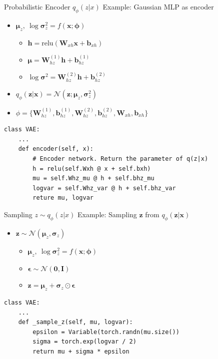 \documentclass{beamer}
\newcommand{\relu}{\mathrm{relu}}
\begin{document}
\begin{frame}[fragile]{Probabilistic Encoder $q_\phi(z|x)$}
	Example: Gaussian MLP as encoder
	\begin{itemize}
		\item $\bm{\mu}_z,~\log\bm{\sigma}_z^2=f(\mathbf{x};\bm{\phi})$
		\begin{itemize}
			\item $\mathbf{h} = \relu\left(\mathbf{W}_{xh}\mathbf{x}+\mathbf{b}_{xh}\right)$
			\item $\bm{\mu} = \mathbf{W}^{(1)}_{hz}\mathbf{h}+\mathbf{b}^{(1)}_{hz}$
			\item $\log \bm{\sigma}^2 = \mathbf{W}^{(2)}_{hz}\mathbf{h}+\mathbf{b}^{(2)}_{hz}$
		\end{itemize}
		\item $q_\phi(\mathbf{z}|\mathbf{x})=\mathcal{N}(\mathbf{z};\bm{\mu}_z, \bm{\sigma}_z^2)$
		\item $\phi = \{\mathbf{W}^{(1)}_{hz}, \mathbf{b}^{(1)}_{hz}, \mathbf{W}^{(2)}_{hz}, \mathbf{b}^{(2)}_{hz}, \mathbf{W}_{xh}, \mathbf{b}_{xh}\}$
	\end{itemize}
\begin{verbatim}
class VAE:
    ...
    def encoder(self, x):
        # Encoder network. Return the parameter of q(z|x)
        h = relu(self.Wxh @ x + self.bxh)
        mu = self.Whz_mu @ h + self.bhz_mu      
        logvar = self.Whz_var @ h + self.bhz_var
        reture mu, logvar
\end{verbatim}
\end{frame}

\begin{frame}[fragile]{Sampling $z\sim q_\phi(z|x)$}
Example: Sampling $\mathbf{z}$ from $q_\phi(\mathbf{z}|\mathbf{x})$
\begin{itemize}
	\item $\mathbf{z}\sim \mathcal{N}(\bm{\mu}_z, \bm{\sigma}_z)$
	\begin{itemize}
		\item $\bm{\mu}_z,~\log\bm{\sigma}^2_z=f(\mathbf{x};\bm{\phi})$
		\item $\bm{\epsilon} \sim \mathcal{N}(\mathbf{0}, \mathbf{I})$
		\item $\mathbf{z} = \bm{\mu}_z + \bm{\sigma}_z \odot \bm{\epsilon} $
	\end{itemize}
\end{itemize}
\begin{verbatim}
class VAE:
    ...
    def _sample_z(self, mu, logvar):
        epsilon = Variable(torch.randn(mu.size())
        sigma = torch.exp(logvar / 2)
        return mu + sigma * epsilon
\end{verbatim}
\end{frame}
\end{document}
